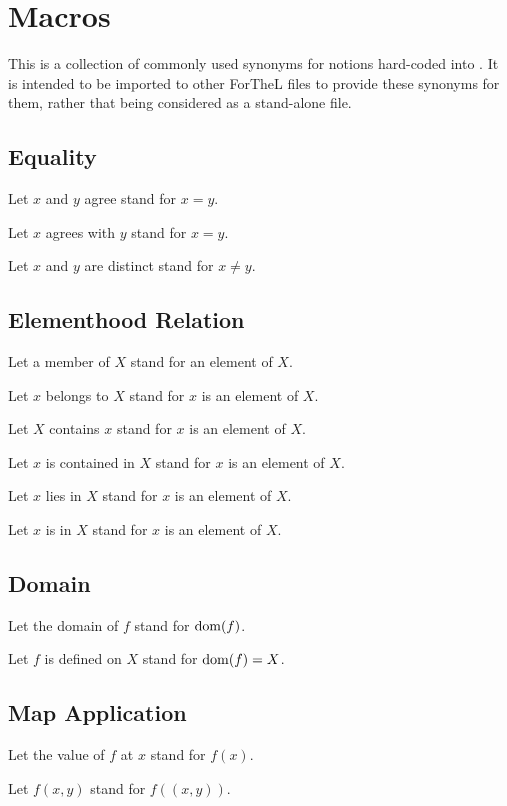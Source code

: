 \documentclass[english]{article}
\begin{document}
\section{Macros}

This is a collection of commonly used synonyms for notions hard-coded into
\Naproche. It is intended to be imported to other ForTheL files to provide
these synonyms for them, rather that being considered as a stand-alone file.

\subsection{Equality}

\begin{forthel}
  Let $x$ and $y$ agree stand for $x = y$.

  Let $x$ agrees with $y$ stand for $x = y$.

  Let $x$ and $y$ are distinct stand for $x \neq y$.
\end{forthel}


\subsection{Elementhood Relation}

\begin{forthel}
  Let a member of $X$ stand for an element of $X$.

  Let $x$ belongs to $X$ stand for $x$ is an element of $X$.

  Let $X$ contains $x$ stand for $x$ is an element of $X$.

  Let $x$ is contained in $X$ stand for $x$ is an element of $X$.

  Let $x$ lies in $X$ stand for $x$ is an element of $X$.

  Let $x$ is in $X$ stand for $x$ is an element of $X$.
\end{forthel}


\subsection{Domain}

\begin{forthel}
  Let the domain of $f$ stand for $\operatorname{dom}(f)$.

  Let $f$ is defined on $X$ stand for $\operatorname{dom}(f) = X$.
\end{forthel}


\subsection{Map Application}

\begin{forthel}
  Let the value of $f$ at $x$ stand for $f(x)$.

  Let $f(x,y)$ stand for $f((x,y))$.
\end{forthel}
\end{document}
